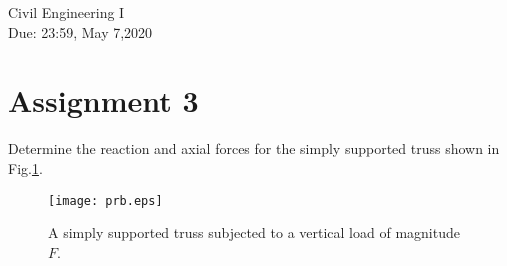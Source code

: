 \documentclass[10pt,a4j]{article}
\newlength{\minitwocolumn}
\begin{document}
\newcommand{\fat}[1]{\mbox{\boldmath $#1$}}
\newcommand{\D}{\partial}
\newcommand{\w}{\omega}
\newcommand{\ga}{\alpha}
\newcommand{\gb}{\beta}
\newcommand{\gx}{\xi}
\newcommand{\gz}{\zeta}
\newcommand{\vhat}[1]{\hat{\fat{#1}}}
\newcommand{\spc}{\vspace{0.7\baselineskip}}
\newcommand{\halfspc}{\vspace{0.3\baselineskip}}

\newcommand{\twofig}[2]
 {
   \begin{figure}
     \begin{minipage}[t]{\minitwocolumn}
         \begin{center}   #1
         \end{center}
     \end{minipage}
         \hspace{\columnsep}
     \begin{minipage}[t]{\minitwocolumn}
         \begin{center} #2
         \end{center}
     \end{minipage}
   \end{figure}
 }
\begin{flushright}
	{Civil Engineering I \\ 
	Due: 23:59, May 7,2020
	}
\end{flushright}
\hspace{10mm}
\section*{Assignment 3}
Determine the reaction and axial forces for the simply supported truss 
shown in Fig.\ref{fig:prb}.
    \begin{figure}[h]
        \begin{center}
        \texttt{[image: prb.eps]} 
        \end{center}
        \caption{A simply supported truss subjected to a vertical load of 
	    magnitude $F$.}
        \label{fig:prb}
    \end{figure}
\end{document}
